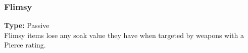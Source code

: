 \subsubsection{Flimsy}
\label{iqty:flimsy}
\textbf{Type:} Passive\\
Flimsy items lose any soak value they have when
targeted by weapons with a Pierce rating.
